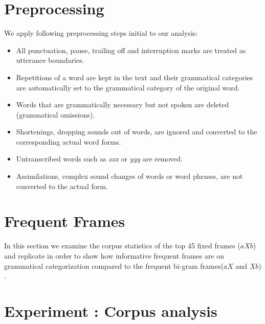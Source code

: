 \appendix
\section{Preprocessing}
\label{app:preprocessing}
We apply following preprocessing steps initial to our analysis:
\begin{itemize}
\item All punctuation, pause, trailing off and interruption marks are
  treated as utterance boundaries.
\item Repetitions of a word are kept in the text and their grammatical
  categories are automatically set to the grammatical category of the
  original word.
\item Words that are grammatically necessary but not spoken are
  deleted (grammatical omissions).
\item Shortenings, dropping sounds out of words, are ignored and converted to
  the corresponding actual word forms.
\item Untranscribed words such as {\it xxx} or {\it yyy} are removed. 
\item Assimilations, complex sound changes of words or word phrases, are not
  converted to the actual form.
\end{itemize}

\section{Frequent Frames}
\label{app:mintz03}
In this section we examine the corpus statistics of the top 45 fixed frames
($aXb$) and replicate \cite{Mintz200391} in order to show how informative
frequent frames are on grammatical categorization compared to the frequent
bi-gram frames($aX$ and $Xb$) \cite{clair2010}.

\section{Experiment : Corpus analysis}


